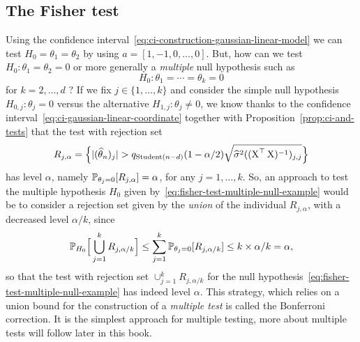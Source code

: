 \subsection{The Fisher test} %
\label{sub:the_fisher_test}

Using the confidence interval~\eqref{eq:ci-construction-gaussian-linear-model} we can test $H_0 = \theta_1 = \theta_2$ by using $a = [1, -1, 0, \ldots, 0]$. 
But, how can we test $H_0 : \theta_1 = \theta_2 = 0$ or more generally a \emph{multiple} null hypothesis such as
\begin{equation}
	\label{eq:fisher-test-multiple-null-example}
	H_0 : \theta_1 = \cdots = \theta_k = 0
\end{equation}
for $k = 2, \ldots, d$ ?
If we fix $j \in \{ 1, \ldots, k\}$ and consider the simple null hypothesis $H_{0, j} : \theta_j = 0$ versus the alternative $H_{1, j} : \theta_j \neq 0$, we know thanks to the confidence interval~\eqref{eq:ci-gaussian-linear-coordinate} together with Proposition~\ref{prop:ci-and-tests} that the test with rejection set 
\begin{equation*}
	R_{j, \alpha} = \Big\{ |(\wh \theta_n)_j| > q_{\stu(n-d)}(1 - \alpha/2) \sqrt{\wh \sigma^2 ((\bX^\top \bX)^{-1})_{j, j}} \Big\}
\end{equation*}
has level $\alpha$, namely $\P_{\theta_j = 0}[R_{j, \alpha}] = \alpha$, for any $j=1, \ldots, k$.
So, an approach to test the multiple hypothesis $H_0$ given by~\eqref{eq:fisher-test-multiple-null-example} would be to consider a rejection set given by the \emph{union} of the individual $R_{j, \alpha}$, with a decreased level $\alpha / k$, since
\begin{equation*}
	\P_{H_0} \Big [ \bigcup_{j=1}^k R_{j, \alpha / k} \Big] 
	\leq \sum_{j=1}^k \P_{\theta_j = 0} [ R_{j, \alpha / k} ] \leq k \times \alpha / k = \alpha,
\end{equation*}
so that the test with rejection set $\cup_{j=1}^k R_{j, \alpha / k}$ for the null hypothesis~\eqref{eq:fisher-test-multiple-null-example} has indeed level $\alpha$.
This strategy, which relies on a union bound for the construction of a \emph{multiple test} is called the Bonferroni correction.%
It is the simplest approach for multiple testing, more about multiple tests will follow later in this book.

